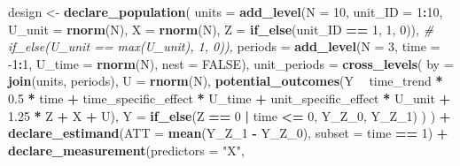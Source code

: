 \documentclass[
]{article}
\newenvironment{Shaded}{\begin{snugshade}}{\end{snugshade}}
\newcommand{\CommentTok}[1]{\textcolor[rgb]{0.56,0.35,0.01}{\textit{#1}}}
\newcommand{\DataTypeTok}[1]{\textcolor[rgb]{0.13,0.29,0.53}{#1}}
\newcommand{\DecValTok}[1]{\textcolor[rgb]{0.00,0.00,0.81}{#1}}
\newcommand{\FloatTok}[1]{\textcolor[rgb]{0.00,0.00,0.81}{#1}}
\newcommand{\KeywordTok}[1]{\textcolor[rgb]{0.13,0.29,0.53}{\textbf{#1}}}
\newcommand{\NormalTok}[1]{#1}
\newcommand{\OperatorTok}[1]{\textcolor[rgb]{0.81,0.36,0.00}{\textbf{#1}}}
\newcommand{\OtherTok}[1]{\textcolor[rgb]{0.56,0.35,0.01}{#1}}
\newcommand{\StringTok}[1]{\textcolor[rgb]{0.31,0.60,0.02}{#1}}
\begin{document}
\begin{Shaded}
\begin{Highlighting}[]
\NormalTok{design <-}\StringTok{ }
\StringTok{  }\KeywordTok{declare_population}\NormalTok{(}
    \DataTypeTok{units =} \KeywordTok{add_level}\NormalTok{(}\DataTypeTok{N =} \DecValTok{10}\NormalTok{, }\DataTypeTok{unit_ID =} \DecValTok{1}\OperatorTok{:}\DecValTok{10}\NormalTok{, }\DataTypeTok{U_unit =} \KeywordTok{rnorm}\NormalTok{(N), }\DataTypeTok{X =} \KeywordTok{rnorm}\NormalTok{(N), }\DataTypeTok{Z =} \KeywordTok{if_else}\NormalTok{(unit_ID }\OperatorTok{==}\StringTok{ }\DecValTok{1}\NormalTok{, }\DecValTok{1}\NormalTok{, }\DecValTok{0}\NormalTok{)), }\CommentTok{# if_else(U_unit == max(U_unit), 1, 0)),}
    \DataTypeTok{periods =} \KeywordTok{add_level}\NormalTok{(}\DataTypeTok{N =} \DecValTok{3}\NormalTok{, }\DataTypeTok{time =} \DecValTok{-1}\OperatorTok{:}\DecValTok{1}\NormalTok{, }\DataTypeTok{U_time =} \KeywordTok{rnorm}\NormalTok{(N), }\DataTypeTok{nest =} \OtherTok{FALSE}\NormalTok{),}
    \DataTypeTok{unit_periods =} \KeywordTok{cross_levels}\NormalTok{(}
      \DataTypeTok{by =} \KeywordTok{join}\NormalTok{(units, periods), }
      \DataTypeTok{U =} \KeywordTok{rnorm}\NormalTok{(N),}
      \KeywordTok{potential_outcomes}\NormalTok{(Y }\OperatorTok{~}\StringTok{ }\NormalTok{time_trend }\OperatorTok{*}\StringTok{ }\FloatTok{0.5} \OperatorTok{*}\StringTok{ }\NormalTok{time }\OperatorTok{+}\StringTok{ }\NormalTok{time_specific_effect }\OperatorTok{*}\StringTok{ }\NormalTok{U_time }\OperatorTok{+}\StringTok{ }
\StringTok{          }\NormalTok{unit_specific_effect }\OperatorTok{*}\StringTok{ }\NormalTok{U_unit }\OperatorTok{+}\StringTok{ }
\StringTok{            }\FloatTok{1.25} \OperatorTok{*}\StringTok{ }\NormalTok{Z }\OperatorTok{+}\StringTok{ }\NormalTok{X }\OperatorTok{+}\StringTok{ }\NormalTok{U),}
      \DataTypeTok{Y =} \KeywordTok{if_else}\NormalTok{(Z }\OperatorTok{==}\StringTok{ }\DecValTok{0} \OperatorTok{|}\StringTok{ }\NormalTok{time }\OperatorTok{<=}\StringTok{ }\DecValTok{0}\NormalTok{, Y_Z_}\DecValTok{0}\NormalTok{, Y_Z_}\DecValTok{1}\NormalTok{)}
\NormalTok{    )}
\NormalTok{  ) }\OperatorTok{+}\StringTok{ }
\StringTok{  }\KeywordTok{declare_estimand}\NormalTok{(}\DataTypeTok{ATT =} \KeywordTok{mean}\NormalTok{(Y_Z_}\DecValTok{1} \OperatorTok{-}\StringTok{ }\NormalTok{Y_Z_}\DecValTok{0}\NormalTok{), }\DataTypeTok{subset =}\NormalTok{ time }\OperatorTok{==}\StringTok{ }\DecValTok{1}\NormalTok{) }\OperatorTok{+}\StringTok{ }
\StringTok{  }\KeywordTok{declare_measurement}\NormalTok{(}\DataTypeTok{predictors =} \StringTok{"X"}\NormalTok{,}

\end{Highlighting}
\end{Shaded}
\end{document}
